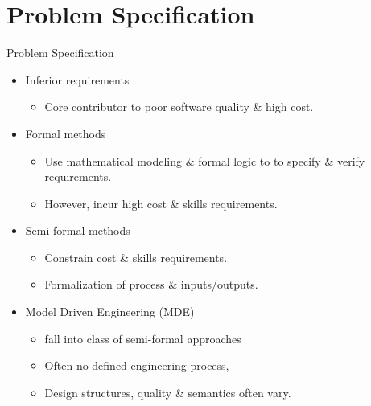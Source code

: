 \section{Problem Specification}

\begin{frame}{Problem Specification}
\initclock

  \begin{itemize}
    \item<+-| alert@+> Inferior requirements
      \begin{itemize}
      	\item Core contributor to poor software quality \& high cost.
      \end{itemize}
    \item<+-| alert@+> Formal methods
      \begin{itemize}
	      \item Use mathematical modeling \& formal logic to to specify \& verify requirements.
    	  \item However, incur high cost \& skills requirements.
      \end{itemize}
    \item<+-| alert@+> Semi-formal methods
      \begin{itemize}
		\item Constrain cost \& skills requirements.
		\item Formalization of process \& inputs/outputs.
	  \end{itemize}		
   \item<+-| alert@+> Model Driven Engineering (MDE)
   	  \begin{itemize}
   	  	\item fall into class of semi-formal approaches
		\item Often no defined engineering process,
		\item Design structures, quality \& semantics often vary.
	  \end{itemize}	
  \end{itemize}

\end{frame}


